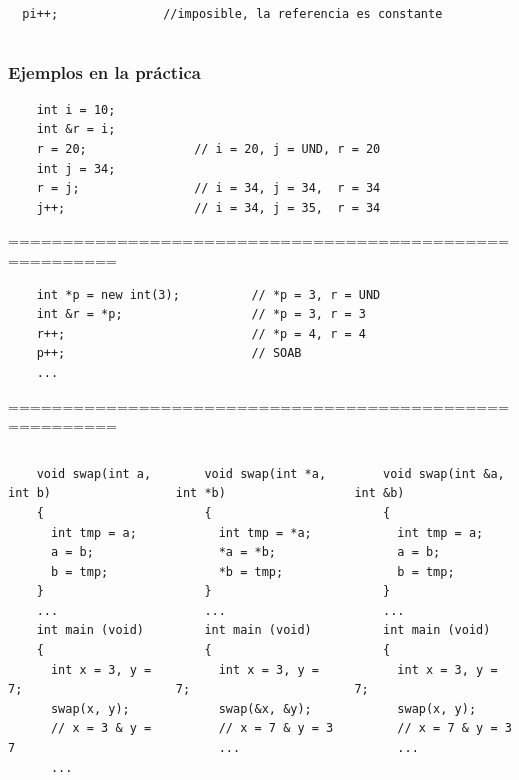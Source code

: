 \documentclass[xcolor=table,spanish,9pt]{beamer}
\begin{document}
\begin{frame}[fragile]
\begin{columns}
\begin{column}{.3\linewidth}
      \begin{center}
	\begin{lstlisting}
  pi++;
	\end{lstlisting}
      \end{center}
    \end{column}
    \begin{column}{.5\linewidth}
      \begin{center}
	\begin{lstlisting}
  //imposible, la referencia es constante
	\end{lstlisting}
      \end{center}
    \end{column}
  \end{columns} 
\end{frame}

\begin{frame}[fragile]
\frametitle{Ejemplos en la práctica}
  \begin{lstlisting}
    int i = 10;
    int &r = i;
    r = 20;               // i = 20, j = UND, r = 20
    int j = 34;
    r = j;                // i = 34, j = 34,  r = 34
    j++;                  // i = 34, j = 35,  r = 34
  \end{lstlisting}
  ========================================================
  \begin{lstlisting}
    int *p = new int(3);          // *p = 3, r = UND
    int &r = *p;                  // *p = 3, r = 3
    r++;                          // *p = 4, r = 4
    p++;                          // SOAB
    ...
  \end{lstlisting}
  ========================================================
  \begin{columns}
    \begin{column}{.33\linewidth}
      \begin{lstlisting}
	void swap(int a, int b)
	{
	  int tmp = a;
	  a = b;
	  b = tmp;
	}
	...
	int main (void)
	{
	  int x = 3, y = 7;
	  swap(x, y);
	  // x = 3 & y = 7
	  ...
      \end{lstlisting}
    \end{column}
    \begin{column}{.33\linewidth}
      \begin{lstlisting}
	void swap(int *a, int *b)
	{
	  int tmp = *a;
	  *a = *b;
	  *b = tmp;
	}
	...
	int main (void)
	{
	  int x = 3, y = 7;
	  swap(&x, &y);
	  // x = 7 & y = 3
	  ...
      \end{lstlisting}
    \end{column}
    \begin{column}{.33\linewidth}
      \begin{lstlisting}
	void swap(int &a, int &b)
	{
	  int tmp = a;
	  a = b;
	  b = tmp;
	}
	...
	int main (void)
	{
	  int x = 3, y = 7;
	  swap(x, y);
	  // x = 7 & y = 3
	  ...
      \end{lstlisting}
    \end{column}
  \end{columns}
\end{frame}
\end{document}
